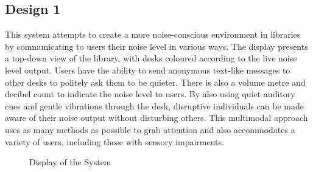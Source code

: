 \begin{center}
\section{Design \hspace{0.5cm} \color{white}1} 
\end{center}
This system attempts to create a more noise-conscious environment in libraries by communicating to users their noise level in various ways. The display presents a top-down view of the library, with desks coloured according to the live noise level output. Users have the ability to send anonymous text-like messages to other desks to politely ask them to be quieter. There is also a volume metre and decibel count to indicate the noise level to users. By also using quiet auditory cues and gentle vibrations through the desk, disruptive individuals can be made aware of their noise output without disturbing others. This multimodal approach uses as many methods as possible to grab attention and also accommodates a variety of users, including those with sensory impairments.
\begin{figure}[h]
    \centering
{}
\caption{Display of the System}
\end{figure}
\restoregeometry

